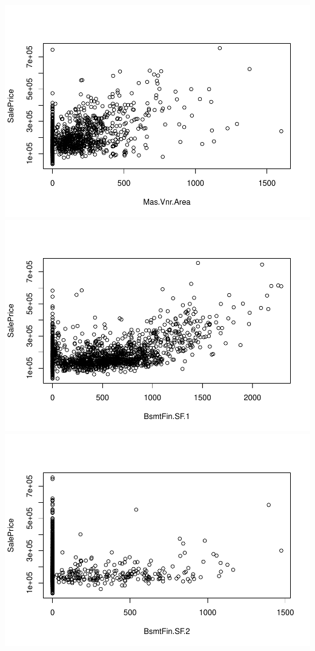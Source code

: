 \documentclass[
]{article}
\begin{document}
\includegraphics{Predicting-Housing-Price_files/figure-latex/unnamed-chunk-2-7.pdf}
\includegraphics{Predicting-Housing-Price_files/figure-latex/unnamed-chunk-2-8.pdf}
\includegraphics{Predicting-Housing-Price_files/figure-latex/unnamed-chunk-2-9.pdf}
\end{document}
